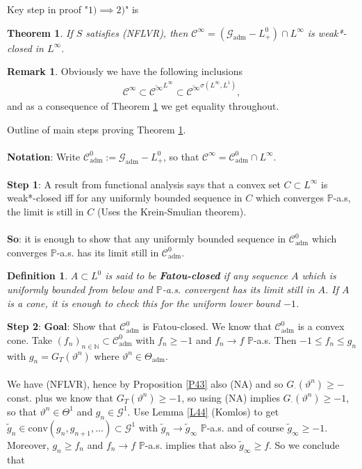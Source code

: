 \documentclass[12pt,a4paper, twoside]{article}
\newtheorem{thm}{Theorem}[section]
\newtheorem{defn}{Definition}[section]
\theoremstyle{definition}
\newtheorem{rem}{Remark}[section]
\newcommand{\PP}{\mathbb{P}} %
\begin{document}
\newpage
Key step in proof "$1)\implies 2)$" is
\begin{thm} \label{T46} If $S$ satisfies (NFLVR), then $\mathcal{C}^\infty = ( \mathcal{G}_\text{adm}-L_+^0) \cap L^\infty$ is weak*-closed in $L^\infty$. 
\end{thm}
\begin{rem}Obviously we have the following inclusions 
\begin{align*}
\mathcal{C}^\infty \subset \overline{\mathcal{C}^\infty}^{L^\infty} \subset \overline{\mathcal{C}^\infty}^{ \sigma( L^\infty, L^1)},
\end{align*}
and as a consequence of Theorem \ref{T46} we get equality throughout. 
\end{rem}
Outline of main steps proving Theorem \ref{T46}.
\\\\
\textbf{Notation}: Write $\mathcal{C}_\text{adm}^0 := \mathcal{G}_\text{adm}-L_+^0$, so that $\mathcal{C}^\infty = \mathcal{C}_\text{adm}^0 \cap L^\infty$. \\
\\
\textbf{Step 1}: A result from functional analysis says that a convex set $C \subset L^\infty$ is weak*-closed iff for any uniformly bounded sequence in $C$ which converges $\PP$-a.s, the limit is still in $C$ (Uses the Krein-Smulian theorem).
\\\\
\textbf{So}: it is enough to show that any uniformly bounded sequence in $\mathcal{C}_\text{adm}^0$ which converges $\PP$-a.s. has its limit still in $\mathcal{C}_\text{adm}^0.$
\begin{defn} $A \subset L^0$ is said to be \textbf{Fatou-closed} if any sequence $A$ which is uniformly bounded from below and $\PP$-a.s. convergent has its limit still in $A$. If $A$ is a cone, it is enough to check this for the uniform lower bound $-1$. 
\end{defn}
\noindent \textbf{Step 2}: \textbf{Goal}: Show that $\mathcal{C}_\text{adm}^0$ is Fatou-closed.  We know that $\mathcal{C}_\text{adm}^0$ is a convex cone. Take $(f_n)_{n \in \mathbb{N}} \subset \mathcal{C}_\text{adm}^0$ with $f_n \geq -1$ and $f_n \to f$ $\PP$-a.s. Then $-1 \leq f_n \leq g_n$ with $g_n = G_T( \vartheta^n)$ where $\vartheta^n \in \Theta_\text{adm}$. \\
\\
We have (NFLVR), hence by Proposition \ref{P43} also (NA) and so $G_\cdot( \vartheta^n) \geq -$const. plus we know that $G_T( \vartheta^n) \geq -1$, so using (NA) implies $G_\cdot ( \vartheta^n) \geq -1$, so that $\vartheta^n \in \Theta^1$ and $g_n \in \mathcal{G}^1$. Use Lemma \ref{L44} (Komlos) to get $\widetilde{g}_n \in \text{conv}(g_n, g_{n+1}, \dots ) \subset \mathcal{G}^1$ with $\widetilde{g}_n \to \widetilde{g}_\infty$ $\PP$-a.s. and of course $\widetilde{g}_\infty \geq -1$. Moreover, $g_n \geq f_n$ and $f_n \to f$ $\PP$-a.s. implies that also $\widetilde{g}_\infty \geq f$. So we conclude that
\end{document}
